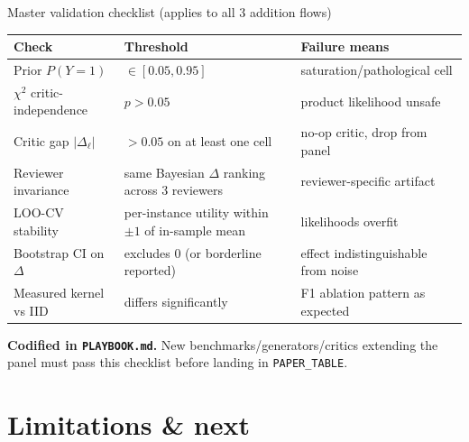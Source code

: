 \documentclass[10pt]{beamer}
\newcommand{\good}[1]{\textcolor{accentGreen}{\textbf{#1}}}
\begin{document}
\begin{frame}{Master validation checklist (applies to all 3 addition flows)}
\vspace{0.15cm}
\begin{table}
\centering
\small
\begin{tabular}{p{4cm}p{2.6cm}p{4cm}}
\toprule
\rowcolor{paleBlue}\textbf{Check} & \textbf{Threshold} & \textbf{Failure means} \\
\midrule
Prior $P(Y{=}1)$ & $\in [0.05, 0.95]$ & saturation/pathological cell \\
$\chi^2$ critic-independence & $p > 0.05$ & product likelihood unsafe \\
Critic gap $|\Delta_\ell|$ & $> 0.05$ on at least one cell & no-op critic, drop from panel \\
Reviewer invariance & same Bayesian $\Delta$ ranking across 3 reviewers & reviewer-specific artifact \\
LOO-CV stability & per-instance utility within $\pm 1$ of in-sample mean & likelihoods overfit \\
Bootstrap CI on $\Delta$ & excludes 0 (or borderline reported) & effect indistinguishable from noise \\
Measured kernel vs IID & differs significantly & F1 ablation pattern as expected \\
\bottomrule
\end{tabular}
\end{table}

\vspace{0.2cm}
\good{Codified in \texttt{PLAYBOOK.md}.} New benchmarks/generators/critics
extending the panel must pass this checklist before landing in
\texttt{PAPER\_TABLE}.
\end{frame}


\section{Limitations \& next}
\hypertarget{out:15}{}
\end{document}
